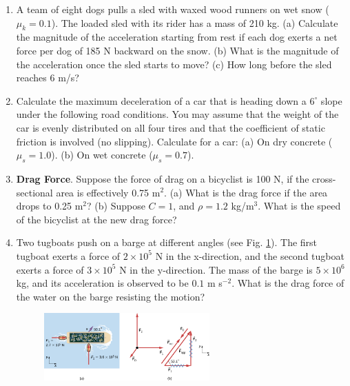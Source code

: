 \documentclass[10pt]{article}
\begin{document}
\begin{enumerate}
\item A team of eight dogs pulls a sled with waxed wood runners on wet snow ($\mu_k = 0.1$). The loaded sled with its rider has a mass of 210 kg.  (a) Calculate the magnitude of the acceleration starting from rest if each dog exerts a net force per dog of 185 N backward on the snow. (b) What is the magnitude of the acceleration once the sled starts to move? (c) How long before the sled reaches 6 m/s? \\ \vspace{2.0cm}
\item Calculate the maximum deceleration of a car that is heading down a $6^{\circ}$ slope under the following road conditions. You may assume that the weight of the car is evenly distributed on all four tires and that the coefficient of static friction is involved (no slipping).  Calculate for a car: (a) On dry concrete ($\mu_s = 1.0$). (b) On wet concrete ($\mu_s = 0.7$). \\ \vspace{2.5cm}
\item \textbf{Drag Force}.  Suppose the force of drag on a bicyclist is 100 N, if the cross-sectional area is effectively 0.75 m$^2$. (a) What is the drag force if the area drops to 0.25 m$^2$? (b) Suppose $C = 1$, and $\rho = 1.2$ kg/m$^3$.  What is the speed of the bicyclist at the new drag force?  \\ \vspace{1cm}
\item Two tugboats push on a barge at different angles (see Fig. \ref{fig:boat}).  The first tugboat exerts a force of $2\times 10^5$ N in the x-direction, and the second tugboat exerts a force of $3 \times 10^5$ N in the y-direction. The mass of the barge is $5 \times 10^6$ kg, and its acceleration is observed to be $0.1$ m s$^{-2}$.  What is the drag force of the water on the barge resisting the motion? \\ \vspace{2cm}
\begin{figure}[ht]
\centering
\includegraphics[width=0.6\textwidth]{figures/boat.jpeg}
\caption{\label{fig:boat}}
\end{figure}
\end{enumerate}
\end{document}
